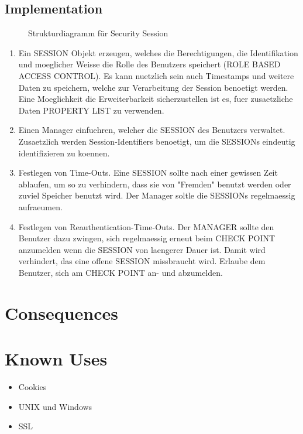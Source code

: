 \subsection{Implementation}

\begin{figure}[H]
  \centering
  
  \caption{Strukturdiagramm f\"ur Security Session}
\end{figure}

\begin{enumerate}
  \item Ein SESSION Objekt erzeugen, welches die Berechtigungen, die Identifikation und moeglicher Weisse die Rolle des Benutzers speichert (ROLE BASED ACCESS CONTROL). Es kann nuetzlich sein auch Timestamps und weitere Daten zu speichern, welche zur Verarbeitung der Session benoetigt werden. Eine Moeglichkeit die Erweiterbarkeit sicherzustellen ist es, fuer zusaetzliche Daten PROPERTY LIST zu verwenden.
  \item Einen Manager einfuehren, welcher die SESSION des Benutzers verwaltet. Zusaetzlich werden Session-Identifiers benoetigt, um die SESSIONs eindeutig identifizieren zu koennen.
  \item Festlegen von Time-Outs. Eine SESSION sollte nach einer gewissen Zeit ablaufen, um so zu verhindern, dass sie von "Fremden" benutzt werden oder zuviel Speicher benutzt wird. Der Manager soltle die SESSIONs regelmaessig aufraeumen.
  \item Festlegen von Reauthentication-Time-Outs. Der MANAGER sollte den Benutzer dazu zwingen, sich regelmaessig erneut beim CHECK POINT anzumelden wenn die SESSION von laengerer Dauer ist. Damit wird verhindert, das eine offene SESSION missbraucht wird.
    Erlaube dem Benutzer, sich am CHECK POINT an- und abzumelden.
\end{enumerate}


\section{Consequences}
\begin{itemize}
\end{itemize}

\section{Known Uses}
\begin{itemize}
  \item Cookies
  \item UNIX und Windows
  \item SSL
\end{itemize}

